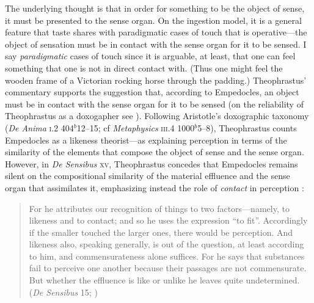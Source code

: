 
The underlying thought is that in order for something to be the object of sense, it must be presented to the sense organ. On the ingestion model, it is a general feature that taste shares with paradigmatic cases of touch that is operative---the object of sensation must be in contact with the sense organ for it to be sensed. I say \emph{paradigmatic} cases of touch since it is arguable, at least, that one can feel something that one is not in direct contact with. (Thus one might feel the wooden frame of a Victorian rocking horse through the padding.) Theophrastus' commentary supports the suggestion that, according to Empedocles, an object must be in contact with the sense organ for it to be sensed (on the reliability of Theophrastus as a doxogapher see \citealt{Kahn:1994qf}). Following Aristotle's doxographic taxonomy (\emph{De Anima} \textsc{i}.2 404\( ^{b} \)12--15; cf \emph{Metaphysics} \textsc{iii}.4 1000\( ^{b} \)5--8), Theophrastus counts Empedocles as a likeness theorist---as explaining perception in terms of the similarity of the elements that compose the object of sense and the sense organ. However, in \emph{De Sensibus} \textsc{xv}, Theophrastus concedes that Empedocles remains silent on the compositional similarity of the material effluence and the sense organ that assimilates it, emphasizing instead the role of \emph{contact} in perception \citep{Kamtekar:2009fk,Sedley:1992uq}:
\begin{quote}
	For he attributes our recognition of things to two factors---namely, to likeness and to contact; and so he uses the expression ``to fit''. Accordingly if the smaller touched the larger ones, there would be perception. And likeness also, speaking generally, is out of the question, at least according to him, and commensurateness alone suffices. For he says that substances fail to perceive one another because their passages are not commensurate. But whether the effluence is like or unlike he leaves quite undetermined. (\emph{De Sensibus} 15; \citealt{Stratton:1917vn})
\end{quote}

